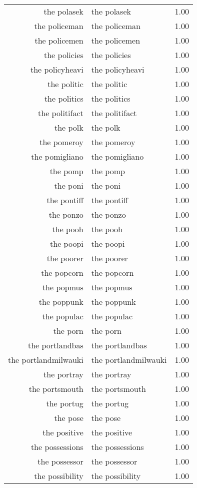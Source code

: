 \begin{table}[ht]
\begin{tabular}{rlr}
  the polasek & the polasek & 1.00 \\ 
  the policeman & the policeman & 1.00 \\ 
  the policemen & the policemen & 1.00 \\ 
  the policies & the policies & 1.00 \\ 
  the policyheavi & the policyheavi & 1.00 \\ 
  the politic & the politic & 1.00 \\ 
  the politics & the politics & 1.00 \\ 
  the politifact & the politifact & 1.00 \\ 
  the polk & the polk & 1.00 \\ 
  the pomeroy & the pomeroy & 1.00 \\ 
  the pomigliano & the pomigliano & 1.00 \\ 
  the pomp & the pomp & 1.00 \\ 
  the poni & the poni & 1.00 \\ 
  the pontiff & the pontiff & 1.00 \\ 
  the ponzo & the ponzo & 1.00 \\ 
  the pooh & the pooh & 1.00 \\ 
  the poopi & the poopi & 1.00 \\ 
  the poorer & the poorer & 1.00 \\ 
  the popcorn & the popcorn & 1.00 \\ 
  the popmus & the popmus & 1.00 \\ 
  the poppunk & the poppunk & 1.00 \\ 
  the populac & the populac & 1.00 \\ 
  the porn & the porn & 1.00 \\ 
  the portlandbas & the portlandbas & 1.00 \\ 
  the portlandmilwauki & the portlandmilwauki & 1.00 \\ 
  the portray & the portray & 1.00 \\ 
  the portsmouth & the portsmouth & 1.00 \\ 
  the portug & the portug & 1.00 \\ 
  the pose & the pose & 1.00 \\ 
  the positive & the positive & 1.00 \\ 
  the possessions & the possessions & 1.00 \\ 
  the possessor & the possessor & 1.00 \\ 
  the possibility & the possibility & 1.00 \\ 

\end{tabular}
\end{table}

